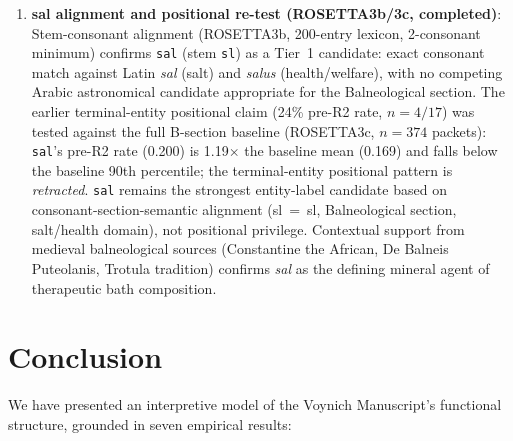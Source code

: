 \documentclass[11pt,a4paper,twocolumn]{article}
\begin{document}
\begin{enumerate}[leftmargin=*,itemsep=2pt]
    \item \textbf{sal alignment and positional re-test (ROSETTA3b/3c, completed)}: Stem-consonant alignment (ROSETTA3b, 200-entry lexicon, 2-consonant minimum) confirms \texttt{sal} (stem \texttt{sl}) as a Tier~1 candidate: exact consonant match against Latin \textit{sal} (salt) and \textit{salus} (health/welfare), with no competing Arabic astronomical candidate appropriate for the Balneological section. The earlier terminal-entity positional claim (24\% pre-R2 rate, $n = 4/17$) was tested against the full B-section baseline (ROSETTA3c, $n = 374$ packets): \texttt{sal}'s pre-R2 rate (0.200) is 1.19$\times$ the baseline mean (0.169) and falls below the baseline 90th percentile; the terminal-entity positional pattern is \emph{retracted}. \texttt{sal} remains the strongest entity-label candidate based on consonant-section-semantic alignment (sl~=~sl, Balneological section, salt/health domain), not positional privilege. Contextual support from medieval balneological sources (Constantine the African, De Balneis Puteolanis, Trotula tradition) confirms \textit{sal} as the defining mineral agent of therapeutic bath composition.

\end{enumerate}

\section{Conclusion}
\label{sec:conclusion}

We have presented an interpretive model of the Voynich Manuscript's functional structure, grounded in seven empirical results:
\end{document}
